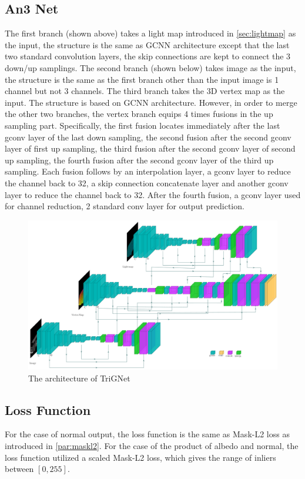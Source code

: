 \documentclass[border=15pt, multi, tikz]{article}
\begin{document}
\subsection{An3 Net}
The first branch (shown above) takes a light map introduced in \ref{sec:lightmap} as the input, the structure is the same as GCNN architecture except that the last two standard convolution layers, the skip connections are kept to connect the 3 down/up samplings. 
The second branch (shown below) takes image as the input, the structure is the same as the first branch other than the input image is 1 channel but not 3 channels. 
The third branch takes the 3D vertex map as the input. The structure is based on GCNN architecture. However, in order to merge the other two branches, the vertex branch equips 4 times fusions in the up sampling part. Specifically, the first fusion locates immediately after the last gconv layer of the last down sampling, the second fusion after the second gconv layer of first up sampling, the third fusion after the second gconv layer of second up sampling, the fourth fusion after the second gconv layer of the third up sampling. Each fusion follows by an interpolation layer, a gconv layer to reduce the channel back to 32, a skip connection concatenate layer and another gconv layer to reduce the channel back to 32. After the fourth fusion, a gconv layer used for channel reduction, 2 standard conv layer for output prediction.

\begin{figure}
	\centering
	\includegraphics[width=1\textwidth]{Figures/trignet} %
	\caption{The architecture of TriGNet}
	\label{fig:albedo-gated-archi}
\end{figure}


\subsection{Loss Function}
For the case of normal output, the loss function is the same as Mask-L2 loss as introduced in \ref{par:maskl2}. For the case of the product of albedo and normal, the loss function utilized a scaled Mask-L2 loss, which gives the range of inliers between $ [0,255] $. 
\end{document}
